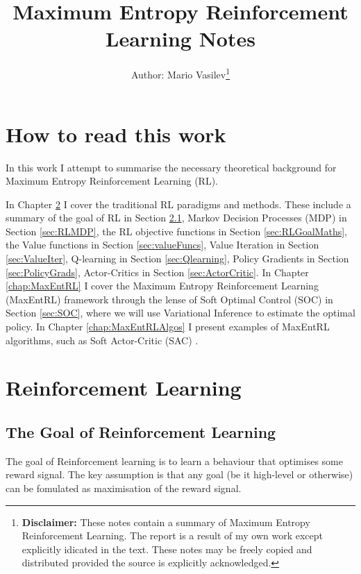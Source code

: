 \documentclass{report}
\title{
  {{\Huge Maximum Entropy Reinforcement Learning Notes}}\\
}
\author{
  Author: Mario Vasilev\thanks{
      {\bf Disclaimer:}
      These notes contain a summary of Maximum Entropy Reinforcement
      Learning. The report is a result of my own work except 
      explicitly idicated in the text. These notes may be 
      freely copied and distributed provided the source is explicitly 
      acknowledged.
    }
}
\numberwithin{equation}{section}
\numberwithin{figure}{section}
\numberwithin{table}{section}
\numberwithin{algorithm}{section}
\begin{document}
\onehalfspacing
\maketitle

\tableofcontents
\setcounter{page}{1}
\newpage

\chapter{How to read this work}\label{chap:howto}
In this work I attempt to summarise the necessary theoretical 
background for Maximum Entropy Reinforcement Learning (RL).

In Chapter \ref{chap:RL} I cover the traditional RL paradigms 
and methods. These include a summary of the goal of RL in 
Section \ref{sec:RLGoal}, Markov Decision Processes (MDP) in 
Section \ref{sec:RLMDP}, the RL objective functions in Section 
\ref{sec:RLGoalMaths}, the Value functions in 
Section \ref{sec:valueFuncs}, 
Value Iteration in Section \ref{sec:ValueIter}, 
Q-learning \citep{QlearningWatkins1992} 
in Section \ref{sec:Qlearning}, Policy Gradients \citep{REINFORCE} 
in 
Section \ref{sec:PolicyGrads}, Actor-Critics \citep{Tsitsiklis} in 
Section \ref{sec:ActorCritic}.
In Chapter \ref{chap:MaxEntRL} I cover the Maximum 
Entropy Reinforcement 
Learning (MaxEntRL) framework through the lense of 
Soft Optimal Control (SOC) in Section \ref{sec:SOC}, where we will 
use Variational Inference to estimate the optimal policy.
In Chapter \ref{chap:MaxEntRLAlgos} I present examples of MaxEntRL 
algorithms, such as Soft Actor-Critic (SAC) \citep{SAC2}.


\chapter{Reinforcement Learning}
\label{chap:RL}

\section{The Goal of Reinforcement Learning}
\label{sec:RLGoal}

The goal of Reinforcement learning is to learn a behaviour that 
optimises some reward signal. The key assumption is that 
any goal (be it high-level or otherwise) can be fomulated as 
maximisation of the reward signal.
\end{document}
